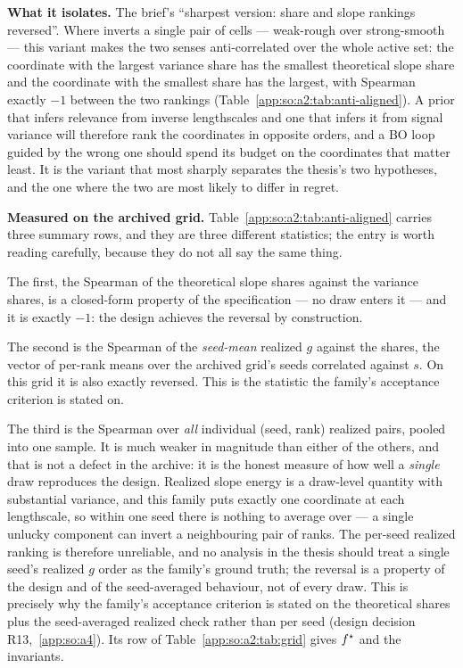\textbf{What it isolates.} The brief's ``sharpest version: share and slope
rankings reversed''. Where  inverts a single pair of cells ---
weak-rough over strong-smooth --- this variant makes the two senses
anti-correlated over the whole active set: the coordinate with the largest
variance share has the
smallest theoretical slope share and the coordinate with the smallest share has
the largest, with Spearman exactly $-1$ between the two rankings
(Table~\ref{app:so:a2:tab:anti-aligned}). A prior that infers relevance from
inverse lengthscales and one that infers it from signal variance will therefore
rank the coordinates in opposite orders, and a BO loop guided by the wrong one
should spend its budget on the coordinates that matter least. It is the variant
that most sharply separates the thesis's two hypotheses, and the one where the
two are most likely to differ in regret.

\textbf{Measured on the archived grid.}
Table~\ref{app:so:a2:tab:anti-aligned} carries three summary rows, and they are
three different statistics; the entry is worth reading carefully, because they
do not all say the same thing.

The first, the Spearman of the theoretical slope shares against the variance
shares, is a closed-form property of the specification --- no draw enters it ---
and it is exactly $-1$: the design achieves the reversal by construction.

The second is the Spearman of the \emph{seed-mean} realized $g$ against the
shares, the vector of per-rank means over the archived grid's seeds correlated
against $s$. On this grid it is also exactly reversed. This is the statistic the
family's acceptance criterion is stated on.

The third is the Spearman over \emph{all} individual (seed, rank) realized
pairs, pooled into one sample. It is much weaker in magnitude than either of the
others, and that is not a defect in the archive: it is the honest measure of how
well a \emph{single} draw reproduces the design. Realized slope energy is a
draw-level quantity with substantial variance, and this family puts exactly one
coordinate at each lengthscale, so within one seed there is nothing to average
over --- a single unlucky component can invert a neighbouring pair of ranks. The
per-seed realized ranking is therefore unreliable, and no analysis in the thesis
should treat a single seed's realized $g$ order as the family's ground truth;
the reversal is a property of the design and of the seed-averaged behaviour, not
of every draw. This is precisely why the family's acceptance criterion is
stated on the theoretical shares plus the seed-averaged realized check rather
than per seed (design decision R13,~\ref{app:so:a4}). Its row of
Table~\ref{app:so:a2:tab:grid} gives $f^\star$ and the invariants.

